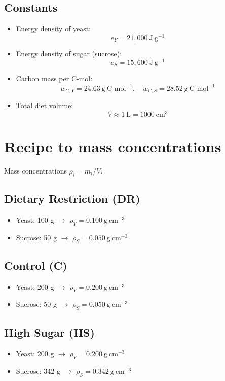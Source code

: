 \documentclass[11pt]{article}
\begin{document}
\subsection{Constants}
\begin{itemize}
  \item Energy density of yeast:
  \[
    e_Y = 21{,}000\ \mathrm{J\ g^{-1}}
  \]
  \item Energy density of sugar (sucrose):
  \[
    e_S = 15{,}600\ \mathrm{J\ g^{-1}}
  \]
  \item Carbon mass per C-mol:
  \[
    w_{C,Y} = 24.63\ \mathrm{g\ C\text{-}mol^{-1}},\quad
    w_{C,S} = 28.52\ \mathrm{g\ C\text{-}mol^{-1}}
  \]
  \item Total diet volume:
  \[
    V \approx 1\ \mathrm{L} = 1000\ \mathrm{cm^3}
  \]
\end{itemize}

\section{Recipe to mass concentrations}

Mass concentrations $\rho_i = m_i / V$.

\subsection{Dietary Restriction (DR)}
\begin{itemize}
  \item Yeast: 100 g $\rightarrow$ $\rho_Y = 0.100\ \mathrm{g\ cm^{-3}}$
  \item Sucrose: 50 g $\rightarrow$ $\rho_S = 0.050\ \mathrm{g\ cm^{-3}}$
\end{itemize}

\subsection{Control (C)}
\begin{itemize}
  \item Yeast: 200 g $\rightarrow$ $\rho_Y = 0.200\ \mathrm{g\ cm^{-3}}$
  \item Sucrose: 50 g $\rightarrow$ $\rho_S = 0.050\ \mathrm{g\ cm^{-3}}$
\end{itemize}

\subsection{High Sugar (HS)}
\begin{itemize}
  \item Yeast: 200 g $\rightarrow$ $\rho_Y = 0.200\ \mathrm{g\ cm^{-3}}$
  \item Sucrose: 342 g $\rightarrow$ $\rho_S = 0.342\ \mathrm{g\ cm^{-3}}$
\end{itemize}
\end{document}
